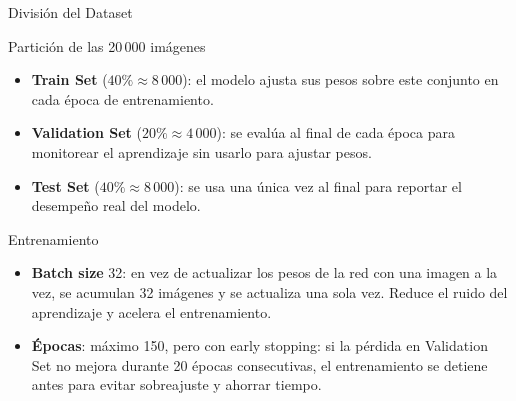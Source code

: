 \documentclass[aspectratio=169, 10pt]{beamer}
\begin{document}
\begin{frame}{División del Dataset}

    \begin{block}{Partición de las 20\,000 imágenes}
        \small
        \begin{itemize}
            \item \textbf{Train Set} ($40\% \approx 8\,000$): el modelo ajusta sus pesos sobre este conjunto en cada época de entrenamiento.
            \item \textbf{Validation Set} ($20\% \approx 4\,000$): se evalúa al final de cada época para monitorear el aprendizaje sin usarlo para ajustar pesos.
            \item \textbf{Test Set} ($40\% \approx 8\,000$): se usa una única vez al final para reportar el desempeño real del modelo.
        \end{itemize}
    \end{block}

    \begin{center}
    \end{center}

    \begin{block}{Entrenamiento}
        \small
        \begin{itemize}
            \item \textbf{Batch size} 32: en vez de actualizar los pesos de la red con una imagen a la vez, se acumulan 32 imágenes y se actualiza una sola vez. Reduce el ruido del aprendizaje y acelera el entrenamiento.
            \item \textbf{Épocas}: máximo 150, pero con early stopping: si la pérdida en Validation Set no mejora durante 20 épocas consecutivas, el entrenamiento se detiene antes para evitar sobreajuste y ahorrar tiempo.
        \end{itemize}
    \end{block}

\end{frame}
\end{document}
